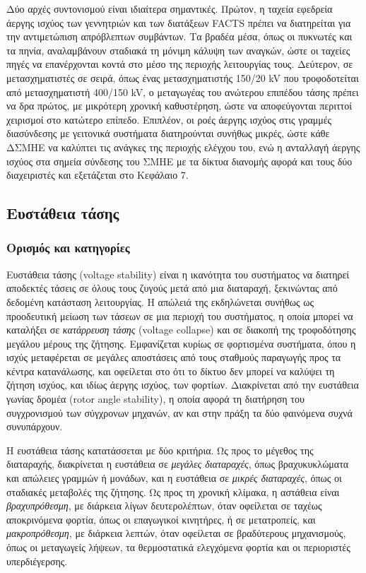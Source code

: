 Δύο αρχές συντονισμού είναι ιδιαίτερα σημαντικές. Πρώτον, η ταχεία εφεδρεία άεργης ισχύος των
γεννητριών και των διατάξεων FACTS πρέπει να διατηρείται για την αντιμετώπιση απρόβλεπτων
συμβάντων. Τα βραδέα μέσα, όπως οι πυκνωτές και τα πηνία, αναλαμβάνουν σταδιακά τη μόνιμη
κάλυψη των αναγκών, ώστε οι ταχείες πηγές να επανέρχονται κοντά στο μέσο της περιοχής
λειτουργίας τους. Δεύτερον, σε μετασχηματιστές σε σειρά, όπως ένας μετασχηματιστής 150/20 kV
που τροφοδοτείται από μετασχηματιστή 400/150 kV, ο μεταγωγέας του ανώτερου επιπέδου τάσης πρέπει
να δρα πρώτος, με μικρότερη χρονική καθυστέρηση, ώστε να αποφεύγονται περιττοί χειρισμοί στο
κατώτερο επίπεδο. Επιπλέον, οι ροές άεργης ισχύος στις γραμμές διασύνδεσης με γειτονικά
συστήματα διατηρούνται συνήθως μικρές, ώστε κάθε ΔΣΜΗΕ να καλύπτει τις ανάγκες της περιοχής
ελέγχου του, ενώ η ανταλλαγή άεργης ισχύος στα σημεία σύνδεσης του ΣΜΗΕ με τα
δίκτυα διανομής αφορά και τους δύο διαχειριστές και εξετάζεται στο Κεφάλαιο 7.

\subsection{Ευστάθεια τάσης}
\label{sec:v-stability}

\subsubsection{Ορισμός και κατηγορίες}

Ευστάθεια τάσης (voltage stability) είναι η ικανότητα του συστήματος να διατηρεί αποδεκτές
τάσεις σε όλους τους ζυγούς μετά από μια διαταραχή, ξεκινώντας από δεδομένη κατάσταση
λειτουργίας. Η απώλειά της εκδηλώνεται συνήθως ως προοδευτική μείωση των τάσεων σε μια περιοχή
του συστήματος, η οποία μπορεί να καταλήξει σε \emph{κατάρρευση τάσης} (voltage collapse) και
σε διακοπή της τροφοδότησης μεγάλου μέρους της ζήτησης. Εμφανίζεται κυρίως σε φορτισμένα
συστήματα, όπου η ισχύς μεταφέρεται σε μεγάλες αποστάσεις από τους σταθμούς παραγωγής προς τα
κέντρα κατανάλωσης, και οφείλεται στο ότι το δίκτυο δεν μπορεί να καλύψει τη ζήτηση ισχύος, και
ιδίως άεργης ισχύος, των φορτίων. Διακρίνεται από την ευστάθεια γωνίας δρομέα (rotor angle
stability), η οποία αφορά τη
διατήρηση του συγχρονισμού των σύγχρονων μηχανών, αν και στην πράξη τα δύο φαινόμενα συχνά
συνυπάρχουν.

Η ευστάθεια τάσης κατατάσσεται με δύο κριτήρια. Ως προς το μέγεθος της διαταραχής, διακρίνεται
η ευστάθεια σε \emph{μεγάλες διαταραχές}, όπως βραχυκυκλώματα και απώλειες γραμμών ή μονάδων,
και η ευστάθεια σε \emph{μικρές διαταραχές}, όπως οι σταδιακές μεταβολές της ζήτησης. Ως προς
τη χρονική κλίμακα, η αστάθεια είναι \emph{βραχυπρόθεσμη}, με διάρκεια λίγων δευτερολέπτων,
όταν οφείλεται σε ταχέως αποκρινόμενα φορτία, όπως οι επαγωγικοί κινητήρες, ή σε μετατροπείς,
και \emph{μακροπρόθεσμη}, με διάρκεια λεπτών, όταν οφείλεται σε βραδύτερους μηχανισμούς, όπως
οι μεταγωγείς λήψεων, τα θερμοστατικά ελεγχόμενα φορτία και οι περιοριστές υπερδιέγερσης.

